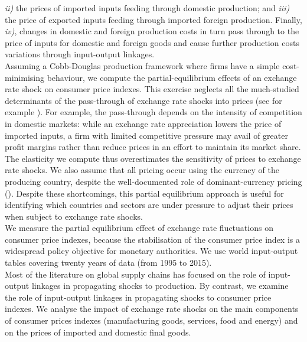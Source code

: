 \documentclass[11pt,a4paper]{article}
\begin{document}
\textit{ii)} the prices of imported inputs feeding through domestic production; and
\textit{iii)} the price of exported inputs feeding through imported foreign production.
Finally, \textit{iv)}, changes in domestic and foreign production costs in turn pass through to the price of inputs for domestic and foreign goods and cause further production costs variations through input-output linkages.\\
Assuming a Cobb-Douglas production framework where firms have a simple cost-minimising behaviour, we compute the partial-equilibrium effects of an exchange rate shock on consumer price indexes.
This exercise neglects all the much-studied determinants of the pass-through of exchange rate shocks into prices (see for example \cite{Berman2012}).
For example, the pass-through depends on the intensity of competition in domestic markets: while an exchange rate appreciation lowers the price of imported inputs, a ﬁrm with limited competitive pressure may avail of greater proﬁt margins rather than reduce prices in an eﬀort to maintain its market share.
The elasticity we compute thus overestimates the sensitivity of prices to exchange rate shocks.
We also assume that all pricing occur using the currency of the producing country, despite the well-documented role of dominant-currency pricing (\cite{Gopinath2020}).
Despite these shortcomings, this partial equilibrium approach is useful for identifying which countries and sectors are under pressure to adjust their prices when subject to exchange rate shocks.\\
We measure the partial equilibrium effect of exchange rate fluctuations on consumer price indexes, because the stabilisation of the consumer price index is a widespread policy objective for monetary authorities. We use world input-output tables covering twenty years of data (from 1995 to 2015).\\
Most of the literature on global supply chains has focused on the role of input-output linkages in propagating shocks to production.
By contrast, we examine the role of input-output linkages in propagating shocks to consumer price indexes.
We analyse the impact of exchange rate shocks on the main components of consumer prices indexes (manufacturing goods, services, food and energy) and on the prices of imported and domestic final goods. \\
\end{document}
